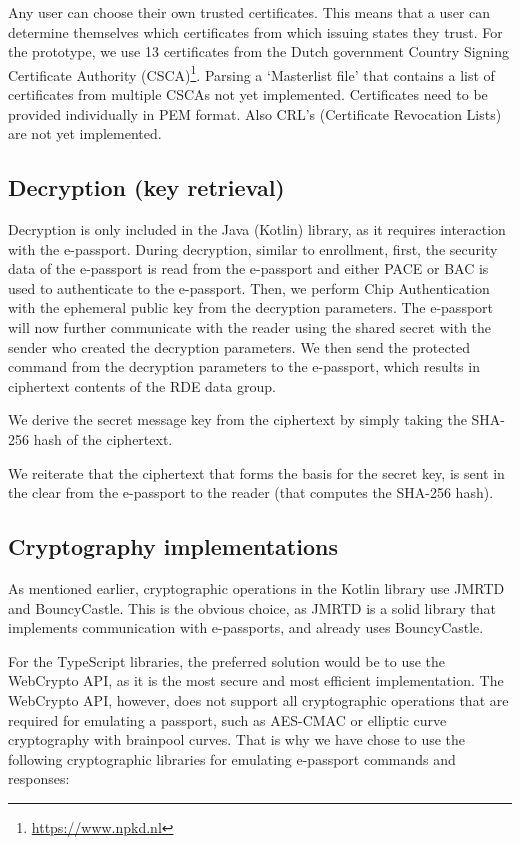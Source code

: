 Any user can choose their own trusted certificates.
This means that a user can determine themselves which certificates from which issuing states they trust.
For the prototype, we use 13 certificates from the Dutch government Country Signing Certificate Authority (CSCA)\footnote{\url{https://www.npkd.nl}}.
Parsing a `Masterlist file' that contains a list of certificates from multiple CSCAs not yet implemented.
Certificates need to be provided individually in PEM format.
Also CRL's (Certificate Revocation Lists) are not yet implemented.

\subsection{Decryption (key retrieval)}\label{subsec:decryption-key-retrieval}
Decryption is only included in the Java (Kotlin) library, as it requires interaction with the e-passport.
During decryption, similar to enrollment, first, the security data of the e-passport is read from the e-passport and either PACE or BAC is used to authenticate to the e-passport.
Then, we perform Chip Authentication with the ephemeral public key from the decryption parameters.
The e-passport will now further communicate with the reader using the shared secret with the sender who created the decryption parameters.
We then send the protected command from the decryption parameters to the e-passport, which results in ciphertext contents of the RDE data group.

We derive the secret message key from the ciphertext by simply taking the SHA-256 hash of the ciphertext.

We reiterate that the ciphertext that forms the basis for the secret key, is sent in the clear from the e-passport to the reader (that computes the SHA-256 hash).

\subsection{Cryptography implementations}\label{subsec:cryptography-implementations}
As mentioned earlier, cryptographic operations in the Kotlin library use JMRTD and BouncyCastle.
This is the obvious choice, as JMRTD is a solid library that implements communication with e-passports, and already uses BouncyCastle.

For the TypeScript libraries, the preferred solution would be to use the WebCrypto API, as it is the most secure and most efficient implementation.
The WebCrypto API, however, does not support all cryptographic operations that are required for emulating a passport, such as AES-CMAC or elliptic curve cryptography with brainpool curves.
That is why we have chose to use the following cryptographic libraries for emulating e-passport commands and responses:

